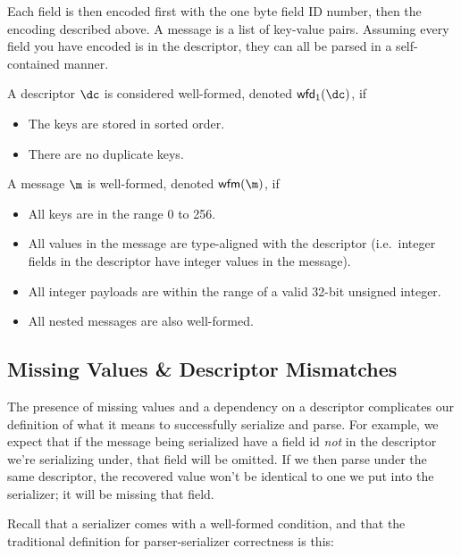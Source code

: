 Each field is then encoded first with the one byte field ID number, then the
encoding described above. A message is a list of key-value pairs. Assuming every
field you have encoded is in the descriptor, they can all be parsed in a
self-contained manner.

\vspace{1em}
\begin{definition}\label{def:inter-dwf}
  A descriptor $\dc$ is considered well-formed, denoted $\wfd{\dc}$, if
  \begin{itemize}
  \item The keys are stored in sorted order.
  \item There are no duplicate keys.
  \end{itemize}
\end{definition}

\vspace{1em}
\begin{definition}\label{def:inter-vwf}
  A message $\m$ is well-formed, denoted $\wfm{\m}$, if
  \begin{itemize}
  \item All keys are in the range 0 to 256.
  \item All values in the message are type-aligned with the descriptor
    (i.e.\ integer fields in the descriptor have integer values in the message).
  \item All integer payloads are within the range of a valid 32-bit unsigned
    integer.
  \item All nested messages are also well-formed.
  \end{itemize}
\end{definition}

\subsection{Missing Values \& Descriptor Mismatches}\label{sec:ip-missing}
The presence of missing values and a dependency on a descriptor complicates our
definition of what it means to successfully serialize and parse. For example, we
expect that if the message being serialized have a field id \emph{not} in the
descriptor we're serializing under, that field will be omitted. If we then parse
under the same descriptor, the recovered value won't be identical to one we put
into the serializer; it will be missing that field.

Recall that a serializer comes with a well-formed condition, and that the
traditional definition for parser-serializer correctness is this:


